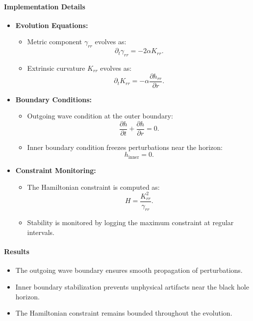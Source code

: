 \documentclass[12pt]{article}
\begin{document}
\paragraph{Implementation Details}
\begin{itemize}
    \item \textbf{Evolution Equations:}
    \begin{itemize}
        \item Metric component $\gamma_{rr}$ evolves as:
        \[
        \partial_t \gamma_{rr} = -2 \alpha K_{rr}.
        \]
        \item Extrinsic curvature $K_{rr}$ evolves as:
        \[
        \partial_t K_{rr} = -\alpha \frac{\partial h_{rr}}{\partial r}.
        \]
    \end{itemize}
    \item \textbf{Boundary Conditions:}
    \begin{itemize}
        \item Outgoing wave condition at the outer boundary:
        \[
        \frac{\partial h}{\partial t} + \frac{\partial h}{\partial r} = 0.
        \]
        \item Inner boundary condition freezes perturbations near the horizon:
        \[
        h_{\text{inner}} = 0.
        \]
    \end{itemize}
    \item \textbf{Constraint Monitoring:}
    \begin{itemize}
        \item The Hamiltonian constraint is computed as:
        \[
        H = \frac{K_{rr}^2}{\gamma_{rr}}.
        \]
        \item Stability is monitored by logging the maximum constraint at regular intervals.
    \end{itemize}
\end{itemize}

\paragraph{Results}
\begin{itemize}
    \item The outgoing wave boundary ensures smooth propagation of perturbations.
    \item Inner boundary stabilization prevents unphysical artifacts near the black hole horizon.
    \item The Hamiltonian constraint remains bounded throughout the evolution.
\end{itemize}
\end{document}
